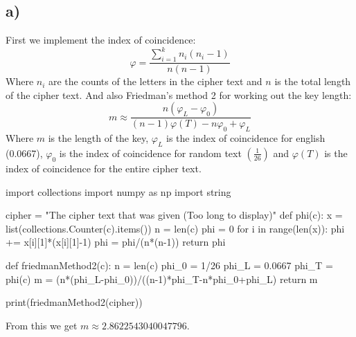 \documentclass{article}
\begin{document}
\subsection*{a)}
First we implement the index of coincidence:
$$\varphi=\frac{\sum_{i=1}^{k}n_i(n_i-1)}{n(n-1)}$$
Where $n_i$ are the counts of the letters in the cipher text and $n$ is the total length of the cipher text. And also Friedman's method 2 for working out the key length:
$$m\approx\frac{n(\varphi_L-\varphi_0)}{(n-1)\varphi(T)-n\varphi_0+\varphi_L}$$
Where $m$ is the length of the key, $\varphi_L$ is the index of coincidence for english (0.0667), $\varphi_0$ is the index of coincidence for random text $\left(\frac{1}{26}\right)$ and $\varphi(T)$ is the index of coincidence for the entire cipher text.
\begin{python}
import collections
import numpy as np
import string

cipher = "The cipher text that was given (Too long to display)"
def phi(c):
    x = list(collections.Counter(c).items())
    n = len(c)
    phi = 0
    for i in range(len(x)):
        phi += x[i][1]*(x[i][1]-1)
    phi = phi/(n*(n-1))
    return phi

def friedmanMethod2(c):
    n = len(c)
    phi_0 = 1/26
    phi_L = 0.0667
    phi_T = phi(c)
    m = (n*(phi_L-phi_0))/((n-1)*phi_T-n*phi_0+phi_L)
    return m

print(friedmanMethod2(cipher))
\end{python}
From this we get $m\approx2.8622543040047796$.
\end{document}
